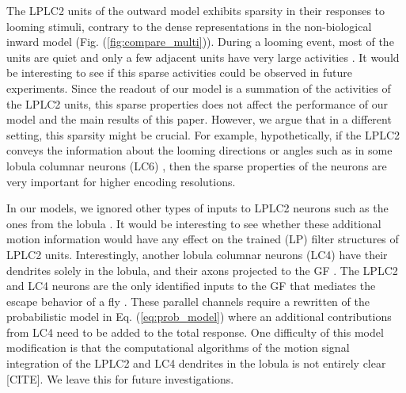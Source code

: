 \documentclass[pdftex,9pt,lineno]{elife}
\begin{document}
The LPLC2 units of the outward model exhibits sparsity in their responses to looming stimuli, contrary to the dense representations in the non-biological inward model (Fig. (\ref{fig:compare_multi})). During a looming event, most of the units are quiet and only a few adjacent units have very large activities \citep{olshausen1997sparse}. It would be interesting to see if this sparse activities could be observed in future experiments. Since the readout of our model is a summation of the activities of the LPLC2 units, this sparse properties does not affect the performance of our model and the main results of this paper. However, we argue that in a different setting, this sparsity might be crucial. For example, hypothetically, if the LPLC2 conveys the information about the looming directions or angles such as in some lobula columnar neurons (LC6) \citep{morimoto2020spatial}, then the sparse properties of the neurons are very important for higher encoding resolutions.




In our models, we ignored other types of inputs to LPLC2 neurons such as the ones from the lobula \citep{von2017feature}. It would be interesting to see whether these additional motion information would have any effect on the trained (LP) filter structures of LPLC2 units. Interestingly, another lobula columnar neurons (LC4) have their dendrites solely in the lobula, and their axons projected to the GF \citep{von2017feature}. The LPLC2 and LC4 neurons are the only identified inputs to the GF that mediates the escape behavior of a fly \citep{von2014spike, ache2019neural}. These parallel channels require a rewritten of the probabilistic model in Eq. (\ref{eq:prob_model}) where an additional contributions from LC4 need to be added to the total response. One difficulty of this model modification is that the computational algorithms of the motion signal integration of the LPLC2 and LC4 dendrites in the lobula is not entirely clear [CITE]. We leave this for future investigations.
\end{document}
